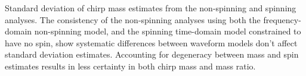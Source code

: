 Standard deviation of chirp mass estimates from the non-spinning and spinning analyses.  The consistency of the non-spinning analyses using both the frequency-domain non-spinning model, and the spinning time-domain model constrained to have no spin, show systematic differences between waveform models don't affect standard deviation estimates.  Accounting for degeneracy between mass and spin estimates results in less certainty in both chirp mass and mass ratio.